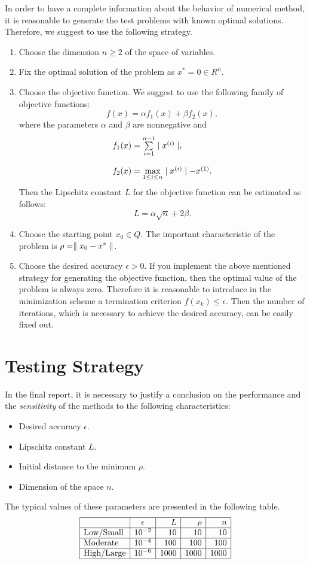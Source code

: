In order to have a complete information about the behavior
of numerical method, it is reasonable to generate the test
problems with known optimal solutions. Therefore, we
suggest to use the following strategy.
\begin{enumerate}
\item
Choose the dimension $n \geq 2$ of the space of variables.
\item
Fix the optimal solution of the problem as $x^* = 0 \in
R^n$.
\item
Choose the objective function. We suggest to use the
following family of objective functions:
$$
f(x) = \alpha f_1(x)
+ \beta f_2(x),
$$
where the parameters $\alpha$ and $\beta$ are nonnegative
and
$$
\ba{l}
f_1(x) = \sum\limits_{i=1}^{n-1} \A x^{(i)} \A,\\
\\
f_2(x) = \max\limits_{1 \leq i \leq n} \A x^{(i)} \A - x^{(1)}.
\ea
$$
Then the Lipschitz constant $L$ for the objective function
can be estimated as follows:
$$
L = \alpha \sqrt{n} + 2 \beta.
$$
\item
Choose the starting point $x_0 \in Q$. The important
characteristic of the problem is $\rho = \N x_0 - x^* \N$.
\item
Choose the desired accuracy $\epsilon > 0$. If you
implement the above mentioned strategy for generating the
objective function, then the optimal value of the problem
is always zero. Therefore it is reasonable to introduce in
the minimization scheme a termination criterion $f(x_k)
\leq \epsilon$. Then the number of iterations, which is
necessary to achieve the desired accuracy, can be easily
fixed out.
\end{enumerate}

\section{Testing Strategy}

In the final report, it is necessary to justify a
conclusion on the performance and the {\em sensitivity} of
the methods to the following characteristics:
\begin{itemize}
\item
Desired accuracy $\epsilon$.
\item
Lipschitz constant $L$.
\item
Initial distance to the minimum $\rho$.
\item
Dimension of the space $n$.
\end{itemize}
The typical values of these parameters are presented in
the following table.
$$
\ba{|l|c|r|r|r|}
\hline
                     & \epsilon & L & \rho & n\\ \hline
\mbox{Low/Small}   &  10^{-2} & 10 & 10 & 10\\ \hline
\mbox{Moderate}      &  10^{-4} & 100 & 100 & 100\\ \hline
\mbox{High/Large}  &  10^{-6} & 1000 & 1000 & 1000 \\
\hline
\ea
$$


